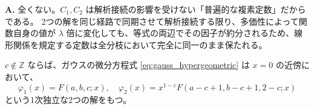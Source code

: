 \begin{Q}
\textbf{A.} 全くない。$C_1, C_2$ は解析接続の影響を受けない「普遍的な複素定数」だからである。
2つの解を同じ経路で同期させて解析接続する限り、多価性によって関数自身の値が $\lambda$ 倍に変化しても、等式の両辺でその因子が約分されるため、線形関係を規定する定数は全分枝において完全に同一のまま保たれる。
\end{Q}
\begin{example}[$x=0$ まわりの局所解]\label{ex:gauss_solutions_zero}
    $c\notin\mathbb{Z}$ ならば、ガウスの微分方程式 \eqref{eq:gauss_hypergeometric} は $x=0$ の近傍において、
    \[
    \varphi_{1}(x)=F(a,b,c;x),\quad \varphi_{2}(x)=x^{1-c}F(a-c+1,b-c+1,2-c;x)
    \]
    という1次独立な2つの解をもつ。
\end{example}


